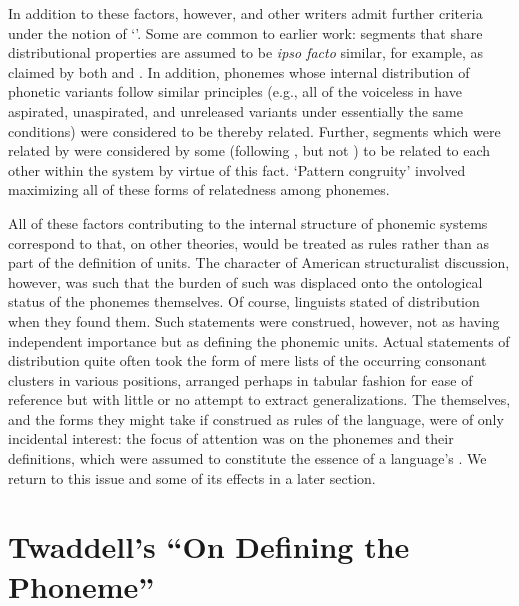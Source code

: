 In addition to these factors, however, {\Swadesh} and other writers admit
further criteria under the notion of `'. Some are
common to earlier work: segments that share distributional properties
are assumed to be \emph{ipso facto} similar, for example, as claimed
by both {\Sapir} and {\Bloomfield}. In addition, phonemes whose internal
distribution of phonetic variants follow similar principles (e.g., all
of the voiceless  in  have aspirated, unaspirated, and
unreleased variants under essentially the same conditions) were
considered to be thereby related. Further, segments which were related
by  were considered by some (following {\Sapir}, but not
{\Bloomfield}) to be related to each other within the system by virtue of
this fact. `Pattern congruity' involved maximizing all of these forms
of relatedness among phonemes.

All of these factors contributing to the internal structure of
phonemic systems correspond to  that, on other theories,
would be treated as rules rather than as part of the definition of
units. The character of American structuralist discussion, however,
was such that the burden of such  was displaced onto the
ontological status of the phonemes themselves. Of course, linguists
stated  of distribution when they found them. Such
statements were construed, however, not as having independent
importance but as defining the phonemic units. Actual statements of
distribution quite often took the form of mere lists of the occurring
consonant clusters in various positions, arranged perhaps in tabular
fashion for ease of reference but with little or no attempt to extract
generalizations. The  themselves, and the forms they might
take if construed as rules of the language, were of only incidental
interest: the focus of attention was on the phonemes and their
definitions, which were assumed to constitute the essence of a
language's . We return to this issue and some of
its effects in a later section.

\section{Twaddell's ``On Defining the Phoneme''}
\label{sec:twaddell}

